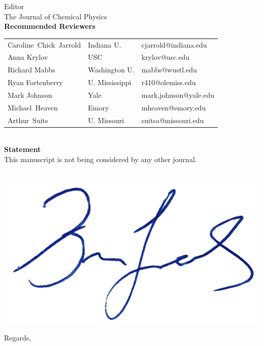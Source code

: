 \documentclass[a4paper,12pt]{letter}
\begin{document}
\begin{sf}
\begin{letter}{%
Editor\\
The Journal of Chemical Physics
}
\vspace*{0ex}\ \\ 
\textbf{Recommended Reviewers}\\[.5ex]
\begin{tabularx}{.5\textwidth}{lll}
	Caroline~Chick~Jarrold & Indiana U. & cjarrold@indiana.edu\\
	Anna Krylov  & USC  & krylov@usc.edu\\
	Richard Mabbs  & Washington U.   & mabbs@wustl.edu\\
	Ryan Fortenberry & U. Mississippi & r410@olemiss.edu\\
	Mark Johnson & Yale & mark.johnson@yale.edu\\
	Michael~Heaven & Emory & mheaven@emory.edu\\
	Arthur~Suits & U. Missouri & suitsa@missouri.edu\\
\end{tabularx}

\vspace*{0ex}\ \\ 
\textbf{Statement}\\[.5ex]
This manuscript is not being considered by any other journal.

\   
\includegraphics[width=.2\textwidth,clip]{signatureXX}
               \closing{Regards,}
\end{letter}
\end{sf}
\end{document}
